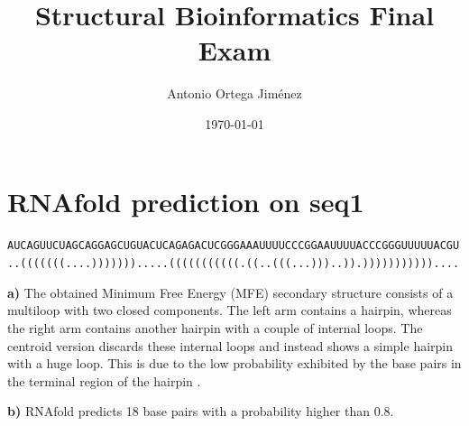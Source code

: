 \documentclass[10pt,a4paper]{article}
\newcommand{\subtitle}[1]{%
  \posttitle{%
    \par\end{center}
    \begin{center}\large#1\end{center}
    \vskip0.5em}%
}
\begin{document}
\title{\textbf{Structural Bioinformatics Final Exam}}
\subtitle{RNA part report}
\date{\today}
\author{Antonio Ortega Jiménez}

\maketitle


\section{RNAfold prediction on seq1}

\small{\texttt{AUCAGUUCUAGCAGGAGCUGUACUCAGAGACUCGGGAAAUUUUCCCGGAAUUUUACCCGGGUUUUUACGU}} \\
\small{\texttt{..(((((((....))))))).....(((((((((((.((..(((...)))..)).)))))))))))....}}

\textbf{a)} The obtained Minimum Free Energy (MFE) secondary structure consists of a multiloop with two closed components. The left arm contains a hairpin, whereas the right arm contains another hairpin with a couple of internal loops. The centroid version discards these internal loops and instead shows a simple hairpin with a huge loop. This is due to the low probability exhibited by the base pairs in the terminal region of the hairpin \cite{gorodkin}.

\textbf{b)} RNAfold predicts 18 base pairs with a probability higher than 0.8.
\end{document}

